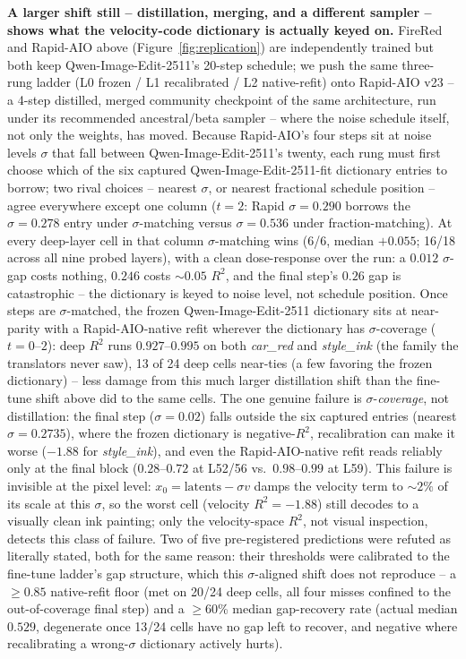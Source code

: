 \documentclass[10pt,twocolumn,letterpaper]{article}
\newcommand{\model}{Qwen-Image-Edit-2511}
\begin{document}
\textbf{A larger shift still -- distillation, merging, and a different
sampler -- shows what the velocity-code dictionary is actually keyed
on.} FireRed and Rapid-AIO above (Figure~\ref{fig:replication}) are
independently trained but both keep \model{}'s 20-step schedule; we
push the same three-rung ladder (L0 frozen / L1 recalibrated / L2
native-refit) onto Rapid-AIO v23 -- a 4-step distilled, merged
community checkpoint of the same architecture, run under its
recommended ancestral/beta sampler -- where the noise schedule itself,
not only the weights, has moved. Because Rapid-AIO's four steps sit at
noise levels $\sigma$ that fall between \model{}'s twenty, each rung
must first choose which of the six captured \model{}-fit dictionary
entries to borrow; two rival choices -- nearest $\sigma$, or nearest
fractional schedule position -- agree everywhere except one column
($t{=}2$: Rapid $\sigma=0.290$ borrows the $\sigma=0.278$ entry under
$\sigma$-matching versus $\sigma=0.536$ under fraction-matching). At
every deep-layer cell in that column $\sigma$-matching wins (6/6,
median $+0.055$; 16/18 across all nine probed layers), with a clean
dose-response over the run: a $0.012$ $\sigma$-gap costs nothing,
$0.246$ costs ${\sim}0.05$ $R^2$, and the final step's $0.26$ gap is
catastrophic -- the dictionary is keyed to noise level, not schedule
position. Once steps are $\sigma$-matched, the frozen \model{}
dictionary sits at near-parity with a Rapid-AIO-native refit wherever
the dictionary has $\sigma$-coverage ($t{=}0$--$2$): deep $R^2$ runs
$0.927$--$0.995$ on both \emph{car\_red} and \emph{style\_ink} (the
family the translators never saw), 13 of 24 deep cells near-ties (a
few favoring the frozen dictionary) -- less damage from this much
larger distillation shift than the fine-tune shift above did to the
same cells. The one genuine failure is $\sigma$-\emph{coverage}, not
distillation: the final step ($\sigma=0.02$) falls outside the six
captured entries (nearest $\sigma=0.2735$), where the frozen dictionary
is negative-$R^2$, recalibration can make it worse ($-1.88$ for
\emph{style\_ink}), and even the Rapid-AIO-native refit reads reliably
only at the final block ($0.28$--$0.72$ at L52/56 vs.\
$0.98$--$0.99$ at L59). This
failure is invisible at the pixel level: $x_0=\text{latents}-\sigma v$
damps the velocity term to ${\sim}2\%$ of its scale at this $\sigma$,
so the worst cell (velocity $R^2=-1.88$) still decodes to a visually
clean ink painting; only the velocity-space $R^2$, not visual
inspection, detects this class of failure. Two of five pre-registered
predictions were refuted as literally stated, both for the same
reason: their thresholds were calibrated to the fine-tune ladder's gap
structure, which this $\sigma$-aligned shift does not reproduce -- a
$\ge0.85$ native-refit floor (met on 20/24 deep cells, all four misses
confined to the out-of-coverage final step) and a $\ge$60\% median
gap-recovery rate (actual median $0.529$, degenerate once 13/24 cells
have no gap left to recover, and negative where recalibrating a
wrong-$\sigma$ dictionary actively hurts).
\end{document}
